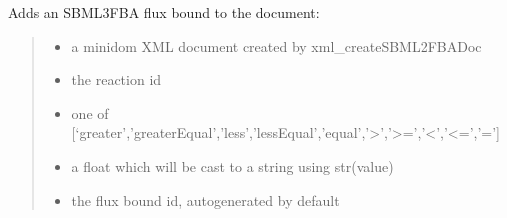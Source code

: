 \documentclass[letterpaper,12pt,english]{sphinxmanual}
\begin{document}
\begin{fulllineitems}
\label{\detokenize{api/io:cbmpy.CBXML.xml_addSBML2FBAFluxBound}}
\pysigstartsignatures
\pysiglinewithargsret
{}
{\sphinxparamcomma {}\sphinxparamcomma {}\sphinxparamcomma {}\sphinxparamcomma {}}
{}
\pysigstopsignatures
\sphinxAtStartPar
Adds an SBML3FBA flux bound to the document:
\begin{quote}\begin{description}
\begin{itemize}
\item {} 
\sphinxAtStartPar
{} \textendash{} a minidom XML document created by xml\_createSBML2FBADoc

\item {} 
\sphinxAtStartPar
{} \textendash{} the reaction id

\item {} 
\sphinxAtStartPar
{} \textendash{} one of {[}‘greater’,’greaterEqual’,’less’,’lessEqual’,’equal’,’\textgreater{}’,’\textgreater{}=’,’\textless{}’,’\textless{}=’,’=’{]}

\item {} 
\sphinxAtStartPar
{} \textendash{} a float which will be cast to a string using str(value)

\item {} 
\sphinxAtStartPar
{} \textendash{} the flux bound id, autogenerated by default

\end{itemize}

\end{description}\end{quote}

\end{fulllineitems}

\end{document}
